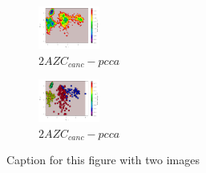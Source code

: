 \documentclass[fleqn,10pt]{wlscirep}
\begin{document}
\begin{figure}[!ht]
\centering
\begin{subfigure}{.5\textwidth}
  \centering
  \includegraphics[width=.9\linewidth]{2AZC_canc/2AZC_canc-tica}
  \caption{$2AZC_{canc}-pcca$}
  \label{fig:2AZC_canc-tica}
\end{subfigure}%
\begin{subfigure}{.5\textwidth}
  \centering
  \includegraphics[width=.9\linewidth]{2AZC_canc/2AZC_canc-pcca}
  \caption{$2AZC_{canc}-pcca$}
  \label{fig:2AZC_canc-pcca}
\end{subfigure}
\caption{Caption for this figure with two images}
\label{fig:2AZC_canc-cluster}
\end{figure}
\end{document}
